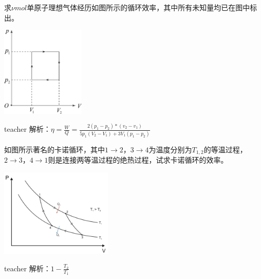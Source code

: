 \begin{example}
求$\nu \si{mol}$单原子理想气体经历如图所示的循环效率，其中所有未知量均已在图中标出。
	\begin{flushright}
		\includegraphics[width = 0.3\textwidth]{images/thermal-17.pdf} 
		\end{flushright}
\begin{taggedblock}{teacher}
\noindent
解析：$\eta=\frac{W}{Q}=\frac{2(p_1-p_2)*(v_2-v_1)}{5p_1(V_2-V_1)+3V_1(p_1-p_2)}$
\end{taggedblock}
\end{example}


\begin{example}
如图所示著名的卡诺循环，其中$1\rightarrow 2$，$3\rightarrow 4$为温度分别为$T_{1,2}$的等温过程，$2\rightarrow 3$，$4\rightarrow 1$则是连接两等温过程的绝热过程，试求卡诺循环的效率。
	\begin{flushright}
		\includegraphics[width = 0.4\textwidth]{images/thermal-15.pdf} 
	\end{flushright}
\begin{taggedblock}{teacher}
\noindent
解析：$1-\frac{T_2}{T_1}$
\end{taggedblock}
\end{example}

